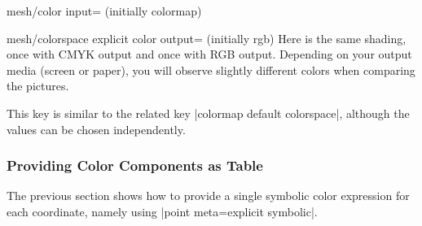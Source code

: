 {{\begin{pgfplotskey}{mesh/color input= (initially colormap)}
\begin{pgfplotskey}{%
	mesh/colorspace explicit color output= (initially rgb)%
}
	Here is the same shading, once with CMYK output and once with RGB output. Depending on your output media (screen or paper), you will observe slightly different colors when comparing the pictures.
\begin{codeexample}[]
\end{codeexample}

\begin{codeexample}[]
\end{codeexample}


	This key is similar to the related key |colormap default colorspace|, although the values can be chosen independently.
\end{pgfplotskey}

\subsubsection{Providing Color Components as Table}
The previous section shows how to provide a single symbolic color expression for each coordinate, namely using |point meta=explicit symbolic|.


\end{pgfplotskey}}}

